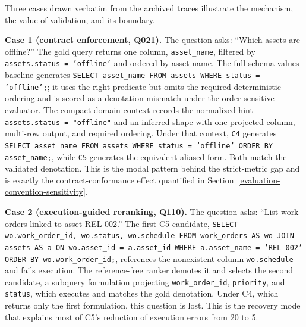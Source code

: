 \documentclass{ieeeaccess}
\begin{document}
Three cases drawn verbatim from the archived traces illustrate the mechanism, the value of validation, and its boundary.

\textbf{Case 1 (contract enforcement, Q021).} The question asks: ``Which assets are offline?'' The gold query returns one column, \texttt{asset\_name}, filtered by \texttt{assets.status = 'offline'} and ordered by asset name. The full-schema-values baseline generates \texttt{SELECT asset\_name FROM assets WHERE status = 'offline';}; it uses the right predicate but omits the required deterministic ordering and is scored as a denotation mismatch under the order-sensitive evaluator. The compact domain context records the normalized hint \texttt{assets.status = "offline"} and an inferred shape with one projected column, multi-row output, and required ordering. Under that context, \texttt{C4} generates \texttt{SELECT asset\_name FROM assets WHERE status = 'offline' ORDER BY asset\_name;}, while \texttt{C5} generates the equivalent aliased form. Both match the validated denotation. This is the modal pattern behind the strict-metric gap and is exactly the contract-conformance effect quantified in Section~\ref{evaluation-convention-sensitivity}.

\textbf{Case 2 (execution-guided reranking, Q110).} The question asks: ``List work orders linked to asset REL-002.'' The first C5 candidate, \texttt{SELECT wo.work\_order\_id, wo.status, wo.schedule FROM work\_orders AS wo JOIN assets AS a ON wo.asset\_id = a.asset\_id WHERE a.asset\_name = 'REL-002' ORDER BY wo.work\_order\_id;}, references the nonexistent column \texttt{wo.schedule} and fails execution. The reference-free ranker demotes it and selects the second candidate, a subquery formulation projecting \texttt{work\_order\_id}, \texttt{priority}, and \texttt{status}, which executes and matches the gold denotation. Under C4, which returns only the first formulation, this question is lost. This is the recovery mode that explains most of C5's reduction of execution errors from 20 to 5.
\end{document}
